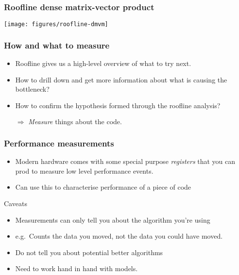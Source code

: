 \documentclass[presentation,aspectratio=43,10pt]{beamer}
\date{}
\begin{document}
\begin{frame}
  \maketitle
\end{frame}

\begin{frame}
  \frametitle{Roofline dense matrix-vector product}
  \begin{center}
    \texttt{[image: figures/roofline-dmvm]}
  \end{center}
\end{frame}
\begin{frame}
  \frametitle{How and what to measure}
  \begin{itemize}
  \item Roofline gives us a high-level overview of what to try next.
  \item How to drill down and get more information about what is
    causing the bottleneck?
  \item How to confirm the hypothesis formed through the roofline
    analysis?
  \item[$\Rightarrow$] \emph{Measure} things about the code.
  \end{itemize}
\end{frame}

\begin{frame}
  \frametitle{Performance measurements}
  \begin{itemize}
  \item Modern hardware comes with some special purpose
    \emph{registers} that you can prod to measure low level
    performance events.
  \item Can use this to characterise performance of a piece of code
  \end{itemize}
  \begin{block}{Caveats}
    \begin{itemize}
    \item Measurements can only tell you about the algorithm you're
      using
    \item e.g.~Counts the data you moved, not the data you could have
      moved.
    \item Do not tell you about potential better algorithms
    \item Need to work hand in hand with models.
    \end{itemize}
  \end{block}
\end{frame}
\end{document}

